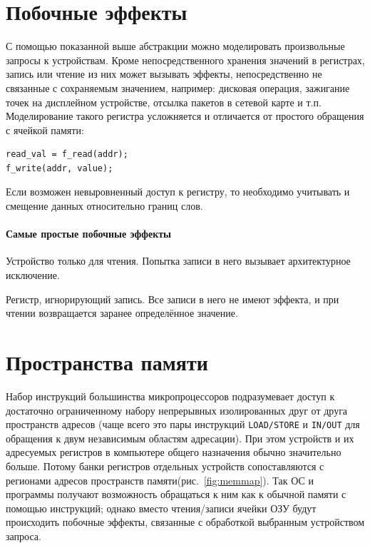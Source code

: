 \section{Побочные эффекты}

С помощью показанной выше абстракции можно моделировать произвольные запросы к устройствам. Кроме непосредственного хранения значений в регистрах, запись или чтение из них может вызывать эффекты, непосредственно не связанные с сохраняемым значением, например: дисковая операция, зажигание точек на дисплейном устройстве, отсылка пакетов в сетевой карте и т.п. Моделирование такого регистра усложняется и отличается от простого обращения с ячейкой памяти:
\begin{lstlisting}
read_val = f_read(addr);
f_write(addr, value);    
\end{lstlisting}

Если возможен невыровненный доступ к регистру, то необходимо учитывать и смещение данных относительно границ слов. 

\paragraph{Самые простые побочные эффекты}
\begin{enumerate*}
\item Устройство только для чтения. Попытка записи в него вызывает архитектурное исключение.
\item Регистр, игнорирующий запись. Все записи в него не имеют эффекта, и при чтении возвращается заранее определённое значение.
\end{enumerate*}

\section{Пространства памяти}

Набор инструкций большинства микропроцессоров подразумевает доступ к достаточно ограниченному набору  непрерывных изолированных друг от друга пространств адресов  (чаще всего это пары инструкций \texttt{LOAD/STORE} и  \texttt{IN/OUT} для обращения к двум независимым областям адресации). При этом устройств и их адресуемых  регистров в компьютере общего назначения обычно значительно больше. Потому банки регистров отдельных устройств сопоставляются с регионами адресов пространств памяти(рис.~\ref{fig:memmap}). Так ОС и программы получают возможность обращаться к ним как к обычной памяти с помощью инструкций; однако вместо чтения/записи ячейки ОЗУ будут происходить побочные эффекты, связанные с обработкой выбранным устройством запроса.

